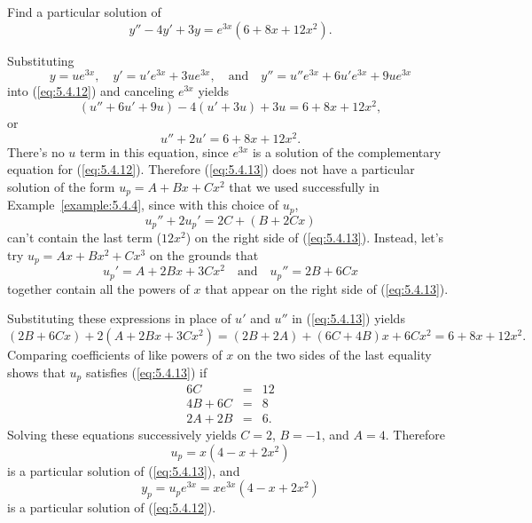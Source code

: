 \documentclass{ximera}
\begin{document}
\begin{example}\label{example:5.4.5}
 Find a particular solution of
\begin{equation} \label{eq:5.4.12}
y''-4y'+3y=e^{3x}(6+8x+12x^2).
\end{equation}

\begin{explanation}
Substituting
$$
y=ue^{3x},\quad y'=u'e^{3x}+3ue^{3x},\quad\mbox{and}\quad
y''=u''e^{3x}+6u'e^{3x}+9ue^{3x}
$$
into (\ref{eq:5.4.12}) and  canceling $e^{3x}$  yields
$$
(u''+6u'+9u)-4(u'+3u)+3u=6+8x+12x^2,
$$
or
\begin{equation} \label{eq:5.4.13}
u''+2u'=6+8x+12x^2.
\end{equation}
There's no $u$ term in this equation, since $e^{3x}$ is a solution of
the complementary equation for (\ref{eq:5.4.12}). 
Therefore (\ref{eq:5.4.13}) does not have a
particular solution of the form $u_p=A+Bx+Cx^2$ that we used
successfully in Example~\ref{example:5.4.4}, since with this choice of
$u_p$,
$$
u_p''+2u_p'=2C+(B+2Cx)
$$
can't contain the last term ($12x^2$) on the right side of
(\ref{eq:5.4.13}). Instead, let's try $u_p=Ax+Bx^2+Cx^3$ on the grounds
that
$$
u_p'=A+2Bx+3Cx^2\quad\mbox{and}\quad
u_p''=2B+6Cx
$$
together contain all the powers of $x$ that appear on the right side
of (\ref{eq:5.4.13}).

Substituting these expressions in place of $u'$ and $u''$  in
(\ref{eq:5.4.13}) yields
$$
(2B+6Cx)+2(A+2Bx+3Cx^2)=(2B+2A)+(6C+4B)x+6Cx^2=6+8x+12x^2.
$$
Comparing coefficients of like powers of $x$ on the two sides of the
last equality shows that $u_p$ satisfies (\ref{eq:5.4.13}) if
$$
\begin{array}{rcr}
6C&=&12\\
4B+6C&=&8\\
2A+2B&=&6.
\end{array}
$$
Solving these equations successively yields $C=2$, $B=-1$, and $A=4$.
Therefore
$$
u_p=x(4-x+2x^2)
$$
is a particular solution of  (\ref{eq:5.4.13}),
and
$$
y_p=u_pe^{3x}=xe^{3x}(4-x+2x^2)
$$
is a particular solution of  (\ref{eq:5.4.12}).
\end{explanation}
\end{example}
\end{document}
